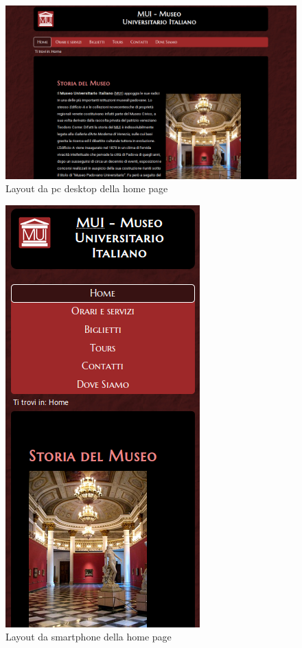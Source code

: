 \documentclass[10pt,a4paper,onecolumn]{article}
\begin{document}
\clearpage
\begin{figure}[H]
\centering
\includegraphics[scale=0.35]{vista_desktop.png}
\caption{Layout da pc desktop della home page}
\end{figure}
\begin{figure}[H]
\centering
\includegraphics[scale=0.35]{vista_mobile.png}
\caption{Layout da smartphone della home page}
\end{figure}
\end{document}
